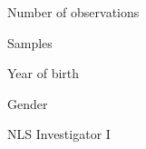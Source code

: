 \begin{frame}\begin{figure}[htp]\centering
\caption{Number of observations}
\end{figure}\end{frame}
\begin{frame}\begin{figure}[htp]\centering
\caption{Samples}
\end{figure}\end{frame}
\begin{frame}\begin{figure}[htp]\centering
\caption{Year of birth}
\end{figure}\end{frame}
\begin{frame}\begin{figure}[htp]\centering
\caption{Gender}
\end{figure}\end{frame}
\begin{frame}\begin{figure}[htp]\centering
\caption{NLS Investigator I}
\end{figure}\end{frame}
